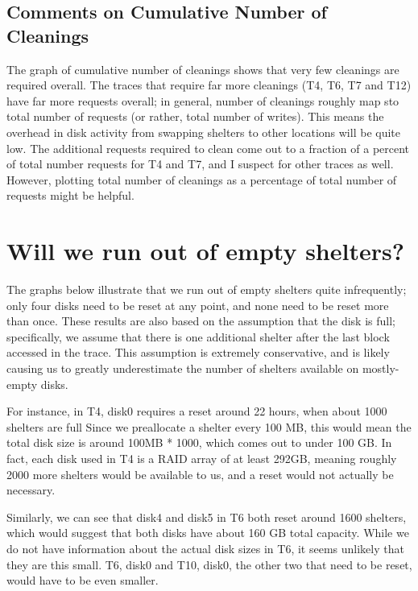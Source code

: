 \documentclass[10pt]{article}
\begin{document}
\subsection{Comments on Cumulative Number of Cleanings}
The graph of cumulative number of cleanings shows that very few cleanings are
required overall. The traces that require far more cleanings (T4, T6, T7
and T12) have far more requests overall; in general, number of cleanings 
roughly map sto total number of requests (or rather, total number of writes).
This means the overhead in disk activity from swapping shelters to other locations
will be quite low. The additional requests required to clean come out to a fraction
of a percent of total number requests for T4 and T7, and I suspect for other traces as
well. However, plotting total number of cleanings as a percentage of total number of 
requests might be helpful. 

\clearpage

\section{Will we run out of empty shelters?}

The graphs below illustrate that we run out of empty shelters quite infrequently; 
only four disks need to be reset at any point, and none need to be reset more than once.
These results are also based on the assumption that the disk is full; 
specifically, we assume that there is one additional shelter after the last block accessed in the trace.
This assumption is extremely conservative,
and is likely causing us to greatly underestimate the number of shelters available
on mostly-empty disks.

For instance, in T4, disk0 requires a reset around 22 hours,
when about 1000 shelters are full
Since we preallocate a shelter every 100 MB, 
this would mean the total disk size is around 100MB * 1000,
which comes out to under 100 GB.
In fact, each disk used in T4 is a RAID array of at least 292GB,
meaning roughly 2000 more shelters would be available to us,
and a reset would not actually be necessary.

Similarly, we can see that disk4 and disk5 in T6 both reset
around 1600 shelters, which would suggest that both disks
have about 160 GB total capacity.
While we do not have information about the actual disk sizes in T6,
it seems unlikely that they are this small. 
T6, disk0 and T10, disk0, the other two that need to be reset,
would have to be even smaller.
\end{document}

